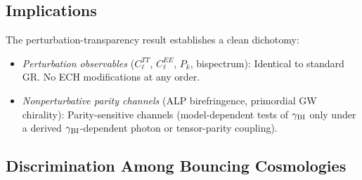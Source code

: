\documentclass[aps,prd,twocolumn,superscriptaddress,showpacs,preprintnumbers,nofootinbib,longbibliography,floatfix]{revtex4-2}
\begin{document}
\subsection{Implications}

The perturbation-transparency result establishes a clean dichotomy:
\begin{itemize}[leftmargin=*]
\item \textit{Perturbation observables} ($C_\ell^{TT}$, $C_\ell^{EE}$, $P_k$,
bispectrum): Identical to standard GR. No ECH modifications at any order.
\item \textit{Nonperturbative parity channels} (ALP birefringence, primordial GW
chirality): Parity-sensitive channels (model-dependent tests of
$\gamma_{\rm BI}$ only under a derived $\gamma_{\rm BI}$-dependent photon
or tensor-parity coupling).
\end{itemize}

\subsection{Discrimination Among Bouncing Cosmologies}\label{sec:discrimination}
\end{document}
